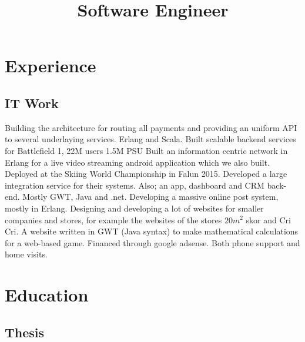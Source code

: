 \documentclass[11pt,a4paper]{moderncv}
\title{Software Engineer}
\begin{document}
\maketitle
\section{\textbf{Experience}}
\subsection{\textbf{IT Work}}
{Building the architecture for routing all payments and providing an uniform API to several underlaying services. Erlang and Scala.}
{Built scalable backend services for Battlefield 1, 22M users 1.5M PSU}
{Built an information centric network in Erlang for a live video streaming android application which we also built.
Deployed at the Skiing World Championship in Falun 2015.}
{Developed a large integration service for their systems. Also; an app, dashboard and CRM back-end. Mostly GWT, Java and .net.}
{Developing a massive online post system, mostly in Erlang.}
{Designing and developing a lot of websites for smaller companies and stores, for example the websites of the stores \begin{math}20m^2\end{math} skor and Cri Cri.}
{A website written in GWT (Java syntax) to make mathematical calculations for a web-based game. Financed through google adsense.}
{Both phone support and home visits.}
\newpage

\section{\textbf{Education}}

\subsection{\textbf{Thesis}}
\end{document}

